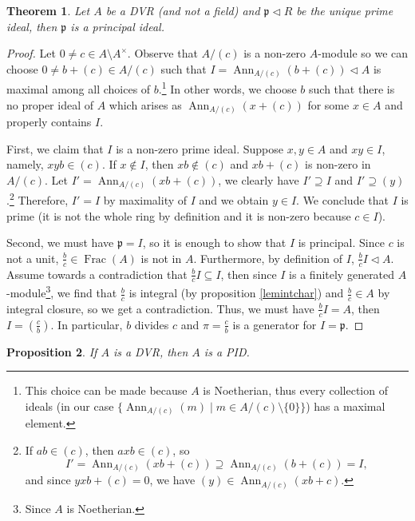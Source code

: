 \documentclass{tufte-handout} %
\newtheorem{thm}{Theorem}
\newtheorem{prop}[thm]{Proposition}
\theoremstyle{definition}
\theoremstyle{remark}
\newcommand{\lp}{{\mathfrak{p}}}
\DeclareMathOperator{\ff}{Frac}
\DeclareMathOperator{\ann}{Ann}
\begin{document}
\begin{thm}
	Let $A$ be a DVR (and not a field) and $\lp \lhd R$ be the unique prime ideal, then $\lp$ is a principal ideal.
\end{thm}
\begin{proof}
	Let $0\neq c \in A \setminus A^{\times}$. Observe that $A/(c)$ is a non-zero $A$-module so we can choose $0\neq b+(c)\in A/(c)$ such that $I = \ann_{A/(c)}(b+(c)) \lhd A$ is maximal among all choices of $b$.\footnote{This choice can be made because $A$ is Noetherian, thus every collection of ideals (in our case $\{\ann_{A/(c)}(m) \mid m \in A/(c) \setminus \{0\}\}$) has a maximal element.} In other words, we choose $b$ such that there is no proper ideal of $A$ which arises as $\ann_{A/(c)}(x+(c))$ for some $x \in A$ and properly contains $I$.
	
	First, we claim that $I$ is a non-zero prime ideal. Suppose $x,y \in A$ and $xy \in I$, namely, $xyb \in (c)$. If $x \notin I$, then $xb \notin (c)$ and $xb+(c)$ is non-zero in $A/(c)$. Let $I' = \ann_{A/(c)}(xb+(c))$, we clearly have $I' \supseteq I$ and $I' \supseteq (y)$.\footnote{If $ab \in (c)$, then $axb \in (c)$, so \[I' = \ann_{A/(c)}(xb+(c)) \supseteq \ann_{A/(c)}(b+(c)) = I,\] and since $yxb + (c) = 0$, we have $(y) \in \ann_{A/(c)}(xb+c)$.} Therefore, $I' = I$ by maximality of $I$ and we obtain $y \in I$. We conclude that $I$ is prime (it is not the whole ring by definition and it is non-zero because $c \in I$).
	
	Second, we must have $\lp = I$, so it is enough to show that $I$ is principal. Since $c$ is not a unit, $\frac{b}{c} \in \ff(A)$ is not in $A$. Furthermore, by definition of $I$, $\frac{b}{c}I \lhd A$. Assume towards a contradiction that $\frac{b}{c}I \subseteq I$, then since $I$ is a finitely generated $A$-module\footnote{Since $A$ is Noetherian.}, we find that $\frac{b}{c}$ is integral (by proposition \ref{lemintchar}) and $\frac{b}{c} \in A$ by integral closure, so we get a contradiction. Thus, we must have $\frac{b}{c}I = A$, then $I = (\frac{c}{b})$. In particular, $b$ divides $c$ and $\pi = \frac{c}{b}$ is a generator for $I = \lp$.
\end{proof}
\begin{prop}
	If $A$ is a DVR, then $A$ is a PID.
\end{prop}
\end{document}
